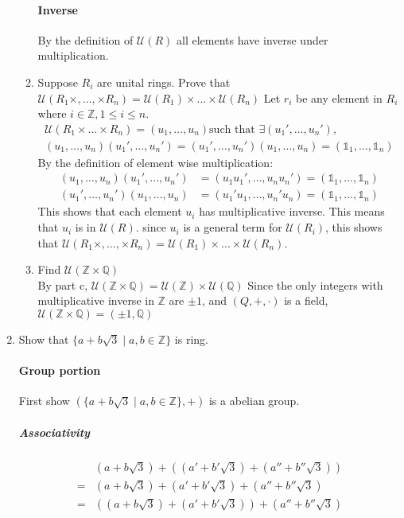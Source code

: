 \documentclass[12pt]{article}
\begin{document}
\begin{enumerate}
\begin{enumerate}
				\paragraph{Inverse}By the definition of $\mathcal{U}(R)$ all elements
				have inverse under multiplication.

			\item Suppose $R_i$ are unital rings. Prove that $\mathcal{U}(R_1 \times,
				\dots, \times R_n) = \mathcal{U}(R_1) \times \dots \times \mathcal{U}(R_n)$
				Let $r_i$ be any element in $R_i$ where $i \in \mathbb{Z}, 1 \le i \le
				n$.
				\begin{align*}
					\mathcal{U}(R_1\times \dots \times R_n) = (u_1, \dots, u_n) \text{
					such that } \exists (u_1', \dots, u_n'), \\
					(u_1, \dots, u_n)(u_1', \dots, u_n') = (u_1', \dots, u_n')(u_1,
					\dots, u_n) = (\mathds{1}_1, \dots, \mathds{1}_n)
				\end{align*}
				By the definition of element wise multiplication:
				\begin{align*}
					(u_1, \dots, u_n)(u_1', \dots, u_n') &= (u_1u_1', \dots, u_nu_n') 
					= (\mathds{1}_1, \dots, \mathds{1}_n)\\
					(u_1', \dots, u_n')(u_1, \dots, u_n) &= (u_1'u_1, \dots, u_n'u_n)
					= (\mathds{1}_1, \dots, \mathds{1}_n)
				\end{align*}
				This shows that each element $u_i$ has multiplicative inverse. This
				means that $u_i$ is in $\mathcal{U}(R)$. since $u_i$ is a general term
				for $\mathcal{U}(R_i)$, this shows that $\mathcal{U}(R_1 \times, \dots,
				\times R_n) = \mathcal{U}(R_1) \times \dots \times \mathcal{U}(R_n)$.
			
			\item Find $\mathcal{U}(\mathbb{Z} \times \mathbb{Q})$ \\
				By part c, $\mathcal{U}(\mathbb{Z} \times \mathbb{Q}) =
				\mathcal{U}(\mathbb{Z}) \times \mathcal{U}(\mathbb{Q})$
				Since the only integers with multiplicative inverse in $\mathbb{Z}$ are
				$\pm1$, and $(Q, +, \cdot)$ is a field, $\mathcal{U}(\mathbb{Z} \times
				\mathbb{Q}) = (\pm1, \mathbb{Q})$
		\end{enumerate}
	
	\item Show that $\{a+b\sqrt{3} \mid a,b\in\mathbb{Z}\}$ is ring.\\
		\paragraph{Group portion}First show $(\{a+b\sqrt{3} \mid a,b\in\mathbb{Z}\},
		+)$ is a abelian group.
		\subparagraph{Associativity}
		\begin{align*}
			&(a+b\sqrt{3}) + ((a'+b'\sqrt{3}) + (a''+b''\sqrt{3}))\\
		 =&(a+b\sqrt{3}) + (a'+b'\sqrt{3}) + (a''+b''\sqrt{3}) \\
		 =&((a+b\sqrt{3}) + (a'+b'\sqrt{3})) + (a''+b''\sqrt{3})
		\end{align*}
	

\end{enumerate}
\end{document}
